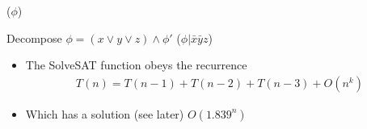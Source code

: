 \documentclass{beamer}
\begin{document}
\begin{frame}[fragile]

  \begin{algorithm}[H]
    \DontPrintSemicolon
    \SolveSAT($\phi$)\; 

    Decompose $\phi=(x\vee y\vee z)\wedge\phi'$\;
    \Return\SolveSAT($\phi\vert\bar{x}\bar{y}z$)\;
  \end{algorithm}
  \begin{itemize}
  \item The SolveSAT function obeys the recurrence
    \begin{align*}
      T(n)=T(n-1)+T(n-2)+T(n-3)+O(n^k)
    \end{align*}
\item Which has a solution (see later) $O(1.839^n)$
  \end{itemize}
\end{frame}
\end{document}
